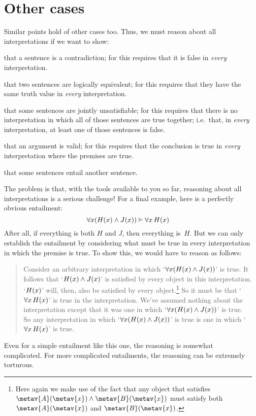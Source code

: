 \section{Other cases}
Similar points hold of other cases too. Thus, we must reason about all interpretations if we want to show:
	\begin{ebullet}
		\item that a sentence is a contradiction; for this requires that it is false in \emph{every} interpretation. 
		\item that two sentences are logically equivalent; for this requires that they have the same truth value in \emph{every} interpretation.
		\item that some sentences are jointly unsatisfiable; for this requires that there is no interpretation in which all of those sentences are true together; i.e.\ that, in \emph{every} interpretation, at  least one of those sentences is false.
		\item that an argument is valid; for this requires that the conclusion is true in \emph{every} interpretation where the premises are true. 
		\item that some sentences entail another sentence.
	\end{ebullet}
The problem is that, with the tools available to you so far, reasoning about all interpretations is a serious challenge! For a final example, here is a perfectly obvious entailment:
	$$\forall x(\mathord{H}(x) \wedge \mathord{J}(x)) \vDash \forall x\, \mathord{H}(x)$$
After all, if everything is both $H$ and $J$, then everything is~$H$. But we can only establish the entailment by considering what must be true in every interpretation in which the premise is true. To show this, we would have to reason as follows:
	\begin{quote}
		Consider an arbitrary interpretation in which `$\forall x(\mathord{H}(x) \wedge \mathord{J}(x))$' is true. It follows that `$\mathord{H}(x) \wedge \mathord{J}(x)$' is satisfied by every object in this interpretation. `$\mathord{H}(x)$' will, then, also be satisfied by every object.\footnote{Here again we make use of the fact that any object that satisfies $\metav{A}(\metav{x}) \land \metav{B}(\metav{x})$ must satisfy both $\metav{A}(\metav{x})$ and $\metav{B}(\metav{x})$.} So it must be that `$\forall x\, \mathord{H}(x)$' is true in the  interpretation. We've assumed nothing about the interpretation except that it was one in which `$\forall x(\mathord{H}(x) \wedge \mathord{J}(x))$' is true. So any interpretation in which `$\forall x(\mathord{H}(x) \wedge \mathord{J}(x))$' is true is one in which `$\forall x\, \mathord{H}(x)$' is true.
\end{quote}
Even for a simple entailment like this one, the reasoning is somewhat complicated. For more complicated entailments, the reasoning can be extremely torturous.

